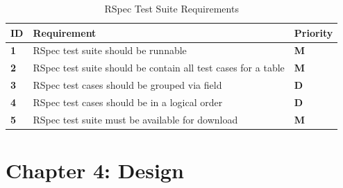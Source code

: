 \documentclass[a4paper,12pt]{article}
\begin{document}
\begin{table}
\centering
\caption{RSpec Test Suite Requirements}
\label{req:3}
\begin{tabularx}{\textwidth}{|l|X|l|}
\hline
\textbf{ID} & \textbf{Requirement}                                          & \textbf{Priority} \\ \hline
\textbf{1}  & RSpec test suite should be runnable                           & \textbf{M}        \\ \hline
\textbf{2}  & RSpec test suite should be contain all test cases for a table & \textbf{M}        \\ \hline
\textbf{3}  & RSpec test cases should be grouped via field                  & \textbf{D}        \\ \hline
\textbf{4}  & RSpec test cases should be in a logical order                 & \textbf{D}        \\ \hline
\textbf{5}  & RSpec test suite must be available for download               & \textbf{M}        \\ \hline
\end{tabularx}
\end{table}

\newpage
\section{Chapter 4: Design}
\end{document}
